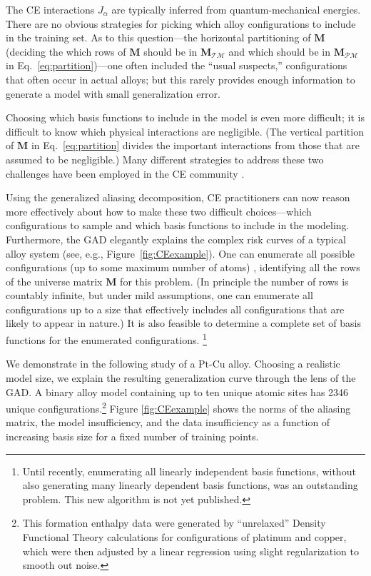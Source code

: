 \documentclass[twocolumn,aps,prx,superscriptaddress,10pt]{revtex4-2}
\newcommand{\0}{\bm{0}}
\newcommand{\M}{\mathcal{M}} %
\newcommand{\V}{\mathcal{P}} %
\newcommand{\T}{\mathcal{T}} %
\newcommand{\bbM}{\mathbf{M}}
\newcommand{\MTM}{\bbM_{\T\M}}
\newcommand{\MVM}{\bbM_{\V\M}}
\begin{document}
The CE interactions $J_\alpha$ are typically inferred from quantum-mechanical energies. There are no obvious strategies for picking which alloy configurations to include in the training set. As to this question---the horizontal partitioning of $\bbM$ (deciding the which rows of $\bbM$ should be in $\MTM$ and which should be in $\MVM$ in Eq.~\eqref{eq:partition})---one often included the ``usual suspects,'' configurations that often occur in actual alloys; but this rarely provides enough information to generate a model with small generalization error.  

Choosing which basis functions to include in the model is even more difficult; it is difficult to know which physical interactions are negligible. (The vertical partition of $\bbM$ in Eq.~\eqref{eq:partition} divides the important interactions from those that are assumed to be negligible.) Many different strategies to address these two challenges have been employed in the CE community \cite{mueller2009bayesian,lerch2009uncle,aangqvist2019icet,hart2005evolutionary,PhysRevB.72.165113,seko2009cluster,nelson2013cluster,nelson2013compressive,PhysRevB.99.134206,avdw:atat,puchala2013thermodynamics,leong2019robust}.

Using the generalized aliasing decomposition, CE practitioners can now reason more effectively about how to make these two difficult choices---which configurations to sample and which basis functions to include in the modeling. Furthermore, the GAD elegantly explains the complex risk curves of a typical alloy system (see, e.g., Figure~\ref{fig:CEexample}). 
One can enumerate all possible configurations (up to some maximum number of atoms) \cite{hart2008algorithm,hart2009generating,hart2012generating}, identifying all the rows of the universe matrix $\bbM$ for this problem.  (In principle the number of rows is countably infinite, but under mild assumptions, one can enumerate all configurations up to a size that effectively includes all configurations that are likely to appear in nature.) It is also feasible to determine a complete set of basis functions \cite{sanchez1993cluster} for the enumerated configurations. \footnote{Until recently, enumerating all linearly independent basis functions, without also generating many linearly dependent basis functions, was an outstanding problem. This new algorithm is not yet published.} 

We demonstrate in the following study of a Pt-Cu alloy.
Choosing a realistic model size, we explain the resulting generalization curve through the lens of the GAD.
A binary alloy model containing up to ten unique atomic sites has 2346 unique configurations.\footnote{This formation enthalpy data were generated by ``unrelaxed'' Density Functional Theory calculations for configurations of platinum and copper, which were then adjusted by a linear regression using slight regularization to smooth out noise.} Figure \ref{fig:CEexample} shows the norms of the aliasing matrix, the model insufficiency, and the data insufficiency as a function of increasing basis size for a fixed number of training points.
\end{document}
